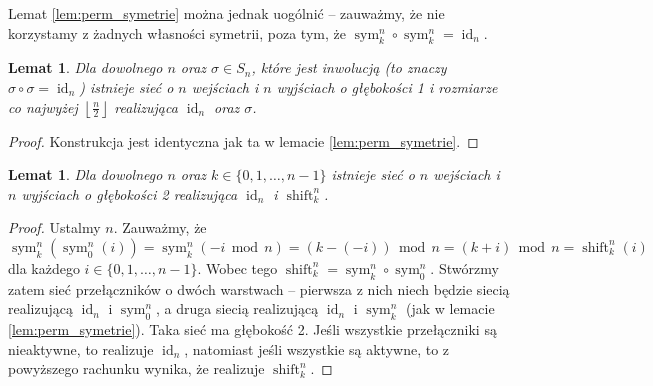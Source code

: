 \documentclass[a4paper]{article}
\renewcommand{\mod}{\, \operatorname{mod} \,}
\newcommand{\shift}[2]{\operatorname{shift}_{#2}^{#1}}
\newcommand{\sym}[2]{\operatorname{sym}_{#2}^{#1}}
\newcommand{\id}[1]{\operatorname{id}_{#1}}
\newcommand{\floor}[1]{\left\lfloor #1 \right\rfloor}
\newtheorem{lem}[tw]{Lemat}
\theoremstyle{definition}
\begin{document}
Lemat \ref{lem:perm_symetrie} można jednak uogólnić -- zauważmy, że nie korzystamy z żadnych własności symetrii, poza tym, że \( \sym n k \circ \sym n k = \id n \).

\begin{lem}\label{lem:perm_inwolucje}
    Dla dowolnego \(n\) oraz \(\sigma \in S_n\), które jest inwolucją (to znaczy \(\sigma \circ \sigma = \id n\)) istnieje sieć o \(n\) wejściach i \(n\) wyjściach o głębokości 1 i rozmiarze co najwyżej \(\floor{\frac{n}{2}}\) realizująca \(\id n\) oraz \(\sigma\).
\end{lem}

\begin{proof}
    Konstrukcja jest identyczna jak ta w lemacie \ref{lem:perm_symetrie}.
\end{proof}

\begin{lem}\label{lem:perm_shifty}
     Dla dowolnego \(n\) oraz \(k \in \{0, 1, \ldots, n-1\}\) istnieje sieć o \(n\) wejściach i \(n\) wyjściach o głębokości 2 realizująca \(\id n\) i \(\shift{n}{k}\).
\end{lem}

\begin{proof}
    Ustalmy \(n\). Zauważmy, że
    \[
    \sym n k (\sym n 0 (i)) = \sym n k (-i \mod n) = (k - (-i)) \mod n = (k + i) \mod n  = \shift n k (i)
    \]
    dla każdego \(i \in \{0, 1, \ldots, n-1\}\). Wobec tego \(\shift n k = \sym n k \circ \sym n 0\). Stwórzmy zatem sieć przełączników o dwóch warstwach -- pierwsza z nich niech będzie siecią realizującą \(\id n\) i \(\sym n 0\), a druga siecią realizującą \(\id n\) i  \(\sym n k\) (jak w lemacie \ref{lem:perm_symetrie}). Taka sieć ma głębokość 2. Jeśli wszystkie przełączniki są nieaktywne, to realizuje \(\id n\), natomiast jeśli wszystkie są aktywne, to z powyższego rachunku wynika, że realizuje \(\shift n k\).
\end{proof}
\end{document}
